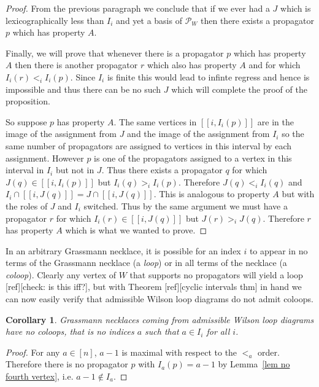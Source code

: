\documentclass[11pt]{article}
\newcommand{\PP}{\mathcal{P}}
\newcommand{\interval}[2]{[\![#1,#2]\!]}
\newtheorem{cor}[thm]{Corollary}
\theoremstyle{remark}
\theoremstyle{definition}
\begin{document}
\begin{proof}
{}From the previous paragraph we conclude that if we ever had a $J$ which is lexicographically less than $I_i$ and yet a basis of $\PP_W$ then there exists a propagator $p$ which has property $A$.

Finally, we will prove that whenever there is a propagator $p$ which has property $A$ then there is another propagator $r$ which also has property $A$ and for which $I_i(r) <_i I_i(p)$.  Since $I_i$ is finite this would lead to infinte regress and hence is impossible and thus there can be no such $J$ which will complete the proof of the proposition.

So suppose $p$ has property $A$.  The same vertices in $\interval{i}{I_i(p)}$ are in the image of the assignment from $J$ and the image of the assignment from $I_i$ so the same number of propagators are assigned to vertices in this interval by each assignment.  However $p$ is one of the propagators assigned to a vertex in this interval in $I_i$ but not in $J$.  Thus there exists a propagator $q$ for which $J(q)\in \interval{i}{I_i(p)}$ but $I_i(q) >_i I_i(p)$.  Therefore $J(q)<_i I_i(q)$ and  $I_i\cap \interval{i}{J(q)} = J\cap \interval{i}{J(q)}$.  This is analogous to property $A$ but with the roles of $J$ and $I_i$ switched.  Thus by the same argument we must have a propagator $r$ for which $I_i(r)\in \interval{i}{J(q)}$ but $J(r)>_i J(q)$.  Therefore $r$ has property $A$ which is what we wanted to prove.

\end{proof}





In an arbitrary Grassmann necklace, it is possible for an index $i$ to appear in no terms of the Grassmann necklace (a {\em loop}) or in all terms of the necklace (a {\em coloop}). Clearly any vertex of $W$ that supports no propagators will yield a loop [ref][check: is this iff?], but with Theorem [ref][cyclic intervals thm] in hand we can now easily verify that admissible Wilson loop diagrams do not admit coloops.


\begin{cor}\label{no coloops}
Grassmann necklaces coming from admissible Wilson loop diagrams have no coloops, that is no indices $a$ such that $a \in I_i$ for all $i$.
\end{cor}
\begin{proof}
For any $a \in [n]$, $a-1$ is maximal with respect to the $<_{a}$ order. Therefore there is no propagator $p$ with $I_{a}(p) = a-1$ by Lemma~\ref{lem no fourth vertex}, i.e. $a-1 \not\in I_{a}$.
\end{proof}
\end{document}
